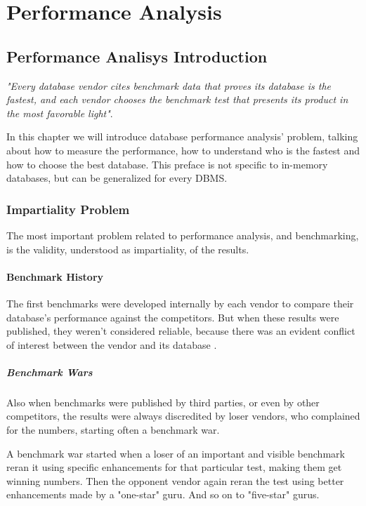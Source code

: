 \part{Performance Analysis}

\chapter{Performance Analisys Introduction}
\emph{"Every database vendor cites benchmark data that proves its database is the fastest, and each vendor chooses the benchmark test that presents its product in the most favorable light"}\cite{burleson}.

In this chapter we will introduce database performance analysis' problem, talking about how to measure the performance, how to understand who is the fastest and how to choose the best database. This preface is not specific to in-memory databases, but can be generalized for every DBMS.
	
	\section{Impartiality Problem}
The most important problem related to performance analysis, and benchmarking, is the validity, understood as impartiality, of the results. 
		
		\subsection{Benchmark History}
The first benchmarks were developed internally by each vendor to compare their database's performance against the competitors. But when these results were published, they weren't considered reliable, because there was an evident conflict of interest between the vendor and its database \cite{gray}.
	
		\subsubsection{Benchmark Wars}
Also when benchmarks were published by third parties, or even by other competitors, the results were always discredited by loser vendors, who complained for the numbers, starting often a benchmark war. 

A benchmark war started when a loser of an important and visible benchmark reran it using specific enhancements for that particular test, making them get winning numbers. Then the opponent vendor again reran the test using better enhancements made by a "one-star" guru. And so on to "five-star" gurus.

